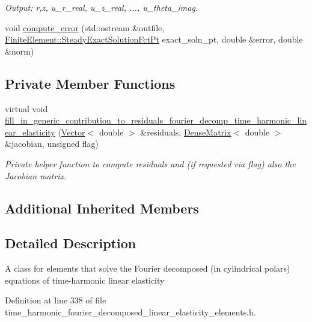 \begin{DoxyCompactItemize}
\begin{DoxyCompactList}\small\item\em Output\+: r,z, u\+\_\+r\+\_\+real, u\+\_\+z\+\_\+real, ..., u\+\_\+theta\+\_\+imag. \end{DoxyCompactList}\item 
void \hyperlink{classoomph_1_1TimeHarmonicFourierDecomposedLinearElasticityEquations_a3d8df91bb12e738299b2eb854340f5c8}{compute\+\_\+error} (std\+::ostream \&outfile, \hyperlink{classoomph_1_1FiniteElement_a690fd33af26cc3e84f39bba6d5a85202}{Finite\+Element\+::\+Steady\+Exact\+Solution\+Fct\+Pt} exact\+\_\+soln\+\_\+pt, double \&error, double \&norm)
\end{DoxyCompactItemize}
\subsection*{Private Member Functions}
\begin{DoxyCompactItemize}
\item 
virtual void \hyperlink{classoomph_1_1TimeHarmonicFourierDecomposedLinearElasticityEquations_abf2e9e9a58dae02f8ca72ee454d2ded7}{fill\+\_\+in\+\_\+generic\+\_\+contribution\+\_\+to\+\_\+residuals\+\_\+fourier\+\_\+decomp\+\_\+time\+\_\+harmonic\+\_\+linear\+\_\+elasticity} (\hyperlink{classoomph_1_1Vector}{Vector}$<$ double $>$ \&residuals, \hyperlink{classoomph_1_1DenseMatrix}{Dense\+Matrix}$<$ double $>$ \&jacobian, unsigned flag)
\begin{DoxyCompactList}\small\item\em Private helper function to compute residuals and (if requested via flag) also the Jacobian matrix. \end{DoxyCompactList}\end{DoxyCompactItemize}
\subsection*{Additional Inherited Members}


\subsection{Detailed Description}
A class for elements that solve the Fourier decomposed (in cylindrical polars) equations of time-\/harmonic linear elasticity 

Definition at line 338 of file time\+\_\+harmonic\+\_\+fourier\+\_\+decomposed\+\_\+linear\+\_\+elasticity\+\_\+elements.\+h.



